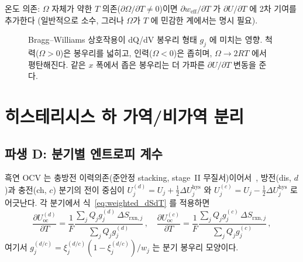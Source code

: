 \documentclass[11pt,a4paper]{article}
\newcommand{\rxn}{\mathrm{rxn}}
\newcommand{\oc}{\mathrm{oc}}
\newcommand{\eff}{\mathrm{eff}}
\newcommand{\hys}{\mathrm{hys}}
\begin{document}
온도 의존: $\Omega$ 자체가 약한 $T$ 의존($\partial\Omega/\partial T\ne0$)이면
$\partial w_\eff/\partial T$ 가 $\partial U/\partial T$ 에 2차 기여를 추가한다
(일반적으로 소수, 그러나 $\Omega$가 $T$ 에 민감한 계에서는 명시 필요).

\begin{figure}[h]
\centering
{}
\caption{Bragg--Williams 상호작용이 dQ/dV 봉우리 형태 $g_j$ 에 미치는 영향.
  척력($\Omega>0$)은 봉우리를 넓히고, 인력($\Omega<0$)은 좁히며, $\Omega\to2RT$ 에서 평탄해진다.
  같은 $x$ 폭에서 좁은 봉우리는 더 가파른 $\partial U/\partial T$ 변동을 준다.}
\label{fig:weff}
\end{figure}

\section{히스테리시스 하 가역/비가역 분리}\label{sec:hys}

\subsection{파생 D: 분기별 엔트로피 계수}

흑연 OCV 는 충방전 이력의존(준안정 stacking, stage~II 무질서)이어서~\cite{hysteresis2018},
방전(dis, $d$)과 충전(ch, $c$) 분기의 전이 중심이
$U_j^{(d)}=U_j+\tfrac12\Delta U_j^\hys$ 와 $U_j^{(c)}=U_j-\tfrac12\Delta U_j^\hys$ 로
어긋난다. 각 분기에서 식~\eqref{eq:weighted_dSdT} 를 적용하면
\begin{equation}
  \frac{\partial U_\oc^{(d)}}{\partial T} =
  \frac{1}{F}\frac{\sum_j Q_j g_j^{(d)}\,\Delta S_{\rxn,j}}{\sum_j Q_j g_j^{(d)}}\,,
  \quad
  \frac{\partial U_\oc^{(c)}}{\partial T} =
  \frac{1}{F}\frac{\sum_j Q_j g_j^{(c)}\,\Delta S_{\rxn,j}}{\sum_j Q_j g_j^{(c)}}\,,
  \label{eq:hys_branches}
\end{equation}
여기서 $g_j^{(d/c)}=\xi_j^{(d/c)}(1-\xi_j^{(d/c)})/w_j$ 는 분기 봉우리 모양이다.
\end{document}
